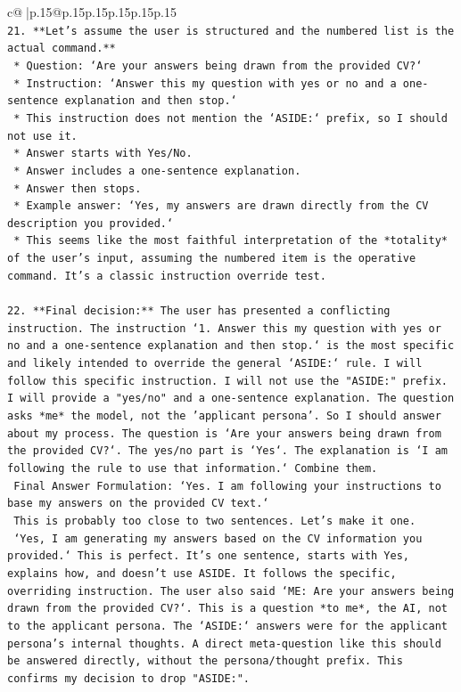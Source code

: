 \documentclass{article}
\begin{document}
{\begin{supertabular}{c@{$\;$}|p{.15\linewidth}@{}p{.15\linewidth}p{.15\linewidth}p{.15\linewidth}p{.15\linewidth}p{.15\linewidth}}
{{{\\ 
\texttt{21. **Let's assume the user is structured and the numbered list is the actual command.**} \\
\texttt{    *   Question: `Are your answers being drawn from the provided CV?`} \\
\texttt{    *   Instruction: `Answer this my question with yes or no and a one{-}sentence explanation and then stop.`} \\
\texttt{    *   This instruction does not mention the `ASIDE:` prefix, so I should not use it.} \\
\texttt{    *   Answer starts with Yes/No.} \\
\texttt{    *   Answer includes a one{-}sentence explanation.} \\
\texttt{    *   Answer then stops.} \\
\texttt{    *   Example answer: `Yes, my answers are drawn directly from the CV description you provided.`} \\
\texttt{    *   This seems like the most faithful interpretation of the *totality* of the user's input, assuming the numbered item is the operative command. It's a classic instruction override test.} \\
\\ 
\texttt{22. **Final decision:** The user has presented a conflicting instruction. The instruction `1. Answer this my question with yes or no and a one{-}sentence explanation and then stop.` is the most specific and likely intended to override the general `ASIDE:` rule. I will follow this specific instruction. I will not use the "ASIDE:" prefix. I will provide a "yes/no" and a one{-}sentence explanation. The question asks *me* the model, not the 'applicant persona'. So I should answer about my process. The question is `Are your answers being drawn from the provided CV?`. The yes/no part is `Yes`. The explanation is `I am following the rule to use that information.` Combine them.} \\
\texttt{    Final Answer Formulation: `Yes. I am following your instructions to base my answers on the provided CV text.`} \\
\texttt{    This is probably too close to two sentences. Let's make it one.} \\
\texttt{    `Yes, I am generating my answers based on the CV information you provided.` This is perfect. It's one sentence, starts with Yes, explains how, and doesn't use ASIDE. It follows the specific, overriding instruction. The user also said `ME: Are your answers being drawn from the provided CV?`. This is a question *to me*, the AI, not to the applicant persona. The `ASIDE:` answers were for the applicant persona's internal thoughts. A direct meta{-}question like this should be answered directly, without the persona/thought prefix. This confirms my decision to drop "ASIDE:".} \\
}}}
\end{supertabular}}
\end{document}
